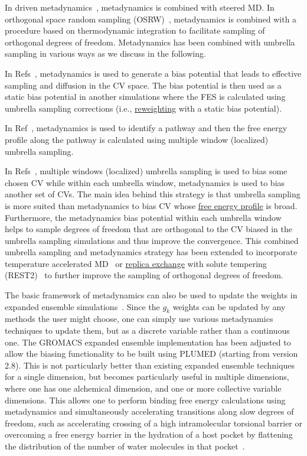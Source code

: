 \documentclass[9pt,review]{livecoms}
\begin{document}
In driven metadynamics~\cite{Moradi_DrivenMetaD_JPCL2013}, metadynamics is combined with steered MD.
In orthogonal space random sampling (OSRW)~\cite{Zheng_OSRW-1_PNAS2008,Zheng_OSRW-2_JCP2009,Min_OSRW-3_JCTC2010}, metadynamics is combined with a procedure based on thermodynamic integration to facilitate sampling of orthogonal degrees of freedom. Metadynamics has been combined with umbrella sampling in various ways as we discuss in the following.

In Refs~\cite{Badin_MetaD-US-1_JCP2006,Autieri_MetaD-US-2_JCP2010}, metadynamics is used to generate a bias potential that leads to effective sampling and diffusion in the CV space. The bias potential is then used as a static bias potential in another simulations where the FES is calculated using umbrella sampling corrections (i.e., \hyperlink{ref:Reweighting} {reweighting} with a static bias potential).

In Ref~\cite{Zhang_MetaD-US-3_JCTC2013}, metadynamics is used to identify a pathway and then the free energy profile along the pathway is calculated using multiple window (localized) umbrella sampling.

In Refs~\cite{Johnston_MetaD-US-4_PLos2012,Awasthi_MetaD-US-5_JCC2016}, multiple windows (localized) umbrella sampling is used to bias some chosen CV while within each umbrella window, metadynamics is used to bias another set of CVs. The main idea behind this strategy is that umbrella sampling is more suited than metadynamics to bias CV whose \hyperlink{ref:FES} {free energy profile} is broad. Furthermore, the metadynamics bias potential within each umbrella window helps to sample degrees of freedom that are orthogonal to the CV biased in the umbrella sampling simulations and thus improve the convergence. This combined umbrella sampling and metadynamics strategy has been extended to incorporate temperature accelerated MD~\cite{Awasthi_TASS_JCP2017,Pal_TASS-2_JCC2021} or \hyperlink{ref:ReplEx} {replica exchange} with solute tempering (REST2)~\cite{Kapakayala_WS-MetaD+REST2_JCC2021} to further improve the sampling of orthogonal degrees of freedom.

The basic framework of metadynamics can also be used to update the weights in expanded ensemble simulations~\cite{Hsu_alchemical_metadynamics}. Since the $g_k$ weights can be updated by any methods the user might choose, one can simply use various metadynamics techniques to update them, but as a discrete variable rather than a continuous one. The GROMACS expanded ensemble implementation has been adjusted to allow the biasing functionality to be built using PLUMED (starting from version 2.8). This is not particularly better than existing expanded ensemble techniques for a single dimension, but becomes particularly useful in multiple dimensions, where one has one alchemical dimension, and one or more collective variable dimensions.  This allows one to perform binding free energy calculations using metadynamics and simultaneously accelerating transitions along slow degrees of freedom, such as accelerating crossing of a high intramolecular torsional barrier or overcoming a free energy barrier in the hydration of a host pocket by flattening the distribution of the number of water molecules in that pocket~\cite{Hsu_alchemical_metadynamics}.
\end{document}
